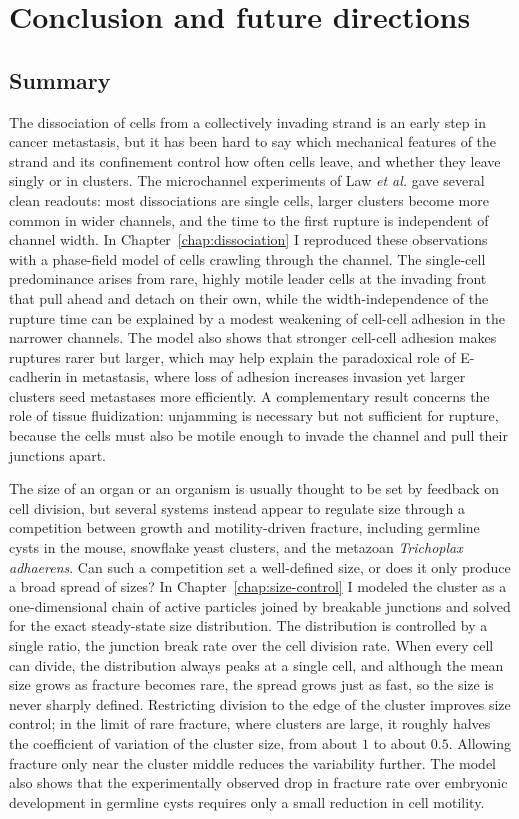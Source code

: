 \chapter{Conclusion and future directions} \label{chap:conclusion}


\section{Summary}
\label{sec:ch6:summary}

The dissociation of cells from a collectively invading strand is an early step in cancer metastasis, but it has been hard to say which mechanical features of the strand and its confinement control how often cells leave, and whether they leave singly or in clusters.
The microchannel experiments of Law \textit{et al.} gave several clean readouts: most dissociations are single cells, larger clusters become more common in wider channels, and the time to the first rupture is independent of channel width.
In Chapter~\ref{chap:dissociation} I reproduced these observations with a phase-field model of cells crawling through the channel.
The single-cell predominance arises from rare, highly motile leader cells at the invading front that pull ahead and detach on their own, while the width-independence of the rupture time can be explained by a modest weakening of cell-cell adhesion in the narrower channels.
The model also shows that stronger cell-cell adhesion makes ruptures rarer but larger, which may help explain the paradoxical role of E-cadherin in metastasis, where loss of adhesion increases invasion yet larger clusters seed metastases more efficiently.
A complementary result concerns the role of tissue fluidization: unjamming is necessary but not sufficient for rupture, because the cells must also be motile enough to invade the channel and pull their junctions apart.

The size of an organ or an organism is usually thought to be set by feedback on cell division, but several systems instead appear to regulate size through a competition between growth and motility-driven fracture, including germline cysts in the mouse, snowflake yeast clusters, and the metazoan \textit{Trichoplax adhaerens}.
Can such a competition set a well-defined size, or does it only produce a broad spread of sizes?
In Chapter~\ref{chap:size-control} I modeled the cluster as a one-dimensional chain of active particles joined by breakable junctions and solved for the exact steady-state size distribution.
The distribution is controlled by a single ratio, the junction break rate over the cell division rate.
When every cell can divide, the distribution always peaks at a single cell, and although the mean size grows as fracture becomes rare, the spread grows just as fast, so the size is never sharply defined.
Restricting division to the edge of the cluster improves size control; in the limit of rare fracture, where clusters are large, it roughly halves the coefficient of variation of the cluster size, from about $1$ to about $0.5$.
Allowing fracture only near the cluster middle reduces the variability further.
The model also shows that the experimentally observed drop in fracture rate over embryonic development in germline cysts requires only a small reduction in cell motility.

